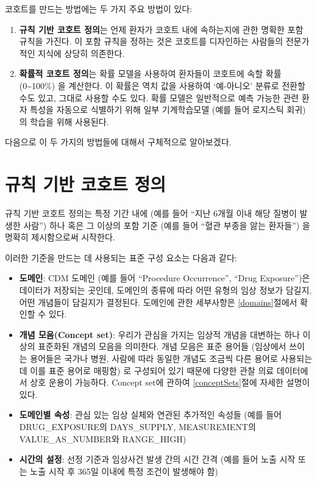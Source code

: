 \documentclass[11pt]{book}
\providecommand{\tightlist}{%
  \setlength{\itemsep}{0pt}\setlength{\parskip}{0pt}}
\theoremstyle{definition}
\theoremstyle{definition}
\theoremstyle{definition}
\theoremstyle{remark}
\begin{document}
코호트를 만드는 방법에는 두 가지 주요 방법이 있다:

\begin{enumerate}
\def\labelenumi{\arabic{enumi}.}
\tightlist
\item
  \textbf{규칙 기반 코호트 정의}는 언제 환자가 코호트 내에 속하는지에
  관한 명확한 포함 규칙을 가진다. 이 포함 규칙을 정하는 것은 코호트를
  디자인하는 사람들의 전문가적인 지식에 상당히 의존한다.
\item
  \textbf{확률적 코호트 정의}는 확률 모델을 사용하여 환자들이 코호트에
  속할 확률 (0\textasciitilde{}100\%) 을 계산한다. 이 확률은 역치 값을
  사용하여 `예-아니오' 분류로 전환할 수도 있고, 그대로 사용할 수도 있다.
  확률 모델은 일반적으로 예측 가능한 관련 환자 특성을 자동으로 식별하기
  위해 일부 기계학습모델 (예를 들어 로지스틱 회귀) 의 학습을 위해
  사용된다.
\end{enumerate}

다음으로 이 두 가지의 방법들에 대해서 구체적으로 알아보겠다.

\section{규칙 기반 코호트 정의}\label{---}

규칙 기반 코호트 정의는 특정 기간 내에 (예를 들어 ``지난 6개월 이내 해당
질병이 발생한 사람'') 하나 혹은 그 이상의 포함 기준 (예를 들어 ``혈관
부종을 앓는 환자들'') 을 명확히 제시함으로써 시작한다.

이러한 기준을 만드는 데 사용되는 표준 구성 요소는 다음과 같다:

\begin{itemize}
\item
  \textbf{도메인}: CDM 도메인 (예를 들어 ``Procedure Occurrence'',
  ``Drug Exposure'')은 데이터가 저장되는 곳인데, 도메인의 종류에 따라
  어떤 유형의 임상 정보가 담길지, 어떤 개념들이 담길지가 결정된다.
  도메인에 관한 세부사항은 \ref{domains}절에서 확인할 수 있다.
\item
  \textbf{개념 모음(Concept set)}: 우리가 관심을 가지는 임상적 개념을
  대변하는 하나 이상의 표준화된 개념의 모음을 의미한다. 개념 모음은 표준
  용어들 (임상에서 쓰이는 용어들은 국가나 병원, 사람에 따라 동일한
  개념도 조금씩 다른 용어로 사용되는데 이를 표준 용어로 매핑함) 로
  구성되어 있기 때문에 다양한 관찰 의료 데이터에서 상호 운용이 가능하다.
  Concept set에 관하여 \ref{conceptSets}절에 자세한 설명이 있다.
\item
  \textbf{도메인별 속성}: 관심 있는 임상 실체와 연관된 추가적인 속성들
  (예를 들어 DRUG\_EXPOSURE의 DAYS\_SUPPLY, MEASUREMENT의
  VALUE\_AS\_NUMBER와 RANGE\_HIGH)
\item
  \textbf{시간의 설정}: 선정 기준과 임상사건 발생 간의 시간 간격 (예를
  들어 노출 시작 또는 노출 시작 후 365일 이내에 특정 조건이 발생해야 함)
\end{itemize}
\end{document}
